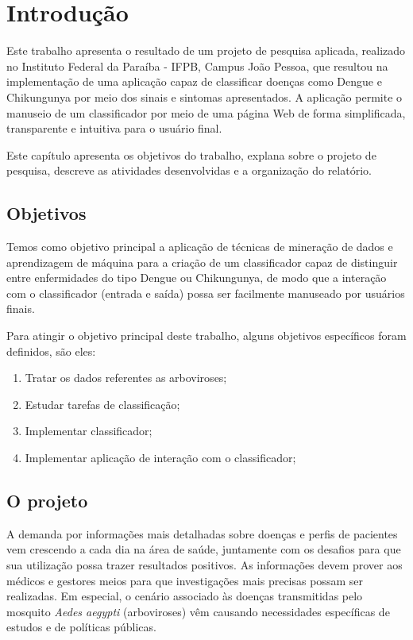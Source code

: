 \chapter{Introdução}

Este trabalho apresenta o resultado de um projeto de pesquisa aplicada, realizado no Instituto Federal da Paraíba - IFPB, Campus João Pessoa, que resultou na implementação de uma aplicação capaz de classificar doenças como Dengue e Chikungunya por meio dos sinais e sintomas apresentados. A aplicação permite o manuseio de um classificador por meio de uma página Web de forma simplificada, transparente e intuitiva para o usuário final.

Este capítulo apresenta os objetivos do trabalho, explana sobre o projeto de pesquisa, descreve as atividades desenvolvidas e a organização do relatório.

\section{Objetivos}

Temos como objetivo principal a aplicação de técnicas de mineração de dados e aprendizagem de máquina para a criação de um classificador capaz de distinguir entre enfermidades do tipo Dengue ou Chikungunya, de modo que a interação com o classificador (entrada e saída) possa ser facilmente manuseado por usuários finais.

Para atingir o objetivo principal deste trabalho, alguns objetivos específicos foram definidos, são eles:

\begin{enumerate}
  \item Tratar os dados referentes as arboviroses;
  \item Estudar tarefas de classificação;
  \item Implementar classificador;
  \item Implementar aplicação de interação com o classificador;
\end{enumerate}


\section{O projeto}

A demanda por informações mais detalhadas sobre doenças e perfis de pacientes vem crescendo a cada dia na área de saúde, juntamente com os desafios para que sua utilização possa trazer resultados positivos. As informações devem prover aos médicos e gestores meios para que investigações mais precisas possam ser realizadas. Em especial, o cenário associado às doenças transmitidas pelo mosquito \emph{Aedes aegypti} (arboviroses) vêm causando necessidades específicas de estudos e de políticas públicas.

